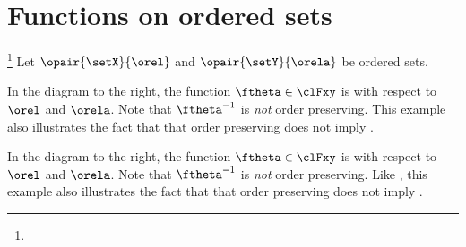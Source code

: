 \section{Functions on ordered sets}
\begin{definition}
\footnote{
  }
\label{def:poset_orderpre}
Let $\opair{\setX}{\orel}$ and $\opair{\setY}{\orela}$ be ordered sets.
\end{definition}

\begin{minipage}{\tw-40mm}%
\begin{example}
\footnotemark
\label{ex:order_M2_L4}
In the diagram to the right, the function $\ftheta\in\clFxy$ 
is  with respect to $\orel$ and $\orela$.
Note that $\ftheta^{-1}$ is \emph{not} order preserving.
This example also illustrates the fact that 
that order preserving does not imply .
\end{example}
\end{minipage}%
%
\hfill%
%

\begin{minipage}{\tw-40mm}%
\begin{example}
\label{ex:order_M3_N5}
In the diagram to the right, the function $\ftheta\in\clFxy$ 
is  with respect to $\orel$ and $\orela$.
Note that $\ftheta^{-1}$ is \emph{not} order preserving.
Like ,
this example also illustrates the fact that 
that order preserving does not imply .
\end{example}
\end{minipage}%
\hfill%
%

